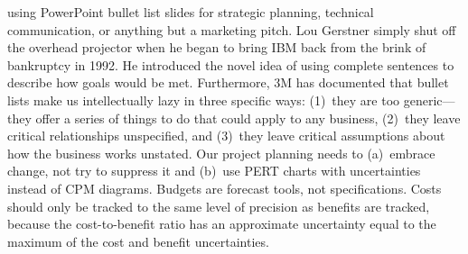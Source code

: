 \documentclass{tufte-handout}
\begin{document}
 using PowerPoint bullet list slides for strategic
planning, technical communication, or anything but a marketing pitch.
Lou Gerstner simply shut off the overhead projector when he
began to bring IBM back from the brink of bankruptcy in 1992.
He introduced the novel idea of using complete sentences to describe
how goals would be met.\cite{Gerstner2002}
Furthermore, 3M has documented\cite{Shaw1998}
that bullet lists make us intellectually
lazy in three specific ways: (1)~they are too generic---they offer a
series of things to do that could apply to any business, (2)~they leave
critical relationships unspecified, and (3)~they leave critical
assumptions about how the business works unstated.
Our project planning needs to (a)~embrace change, not try
to suppress it and (b)~use PERT charts with uncertainties
instead of CPM diagrams.\cite{Martin2003}
Budgets are forecast tools, not specifications.
Costs should only be tracked to the same level of precision as benefits
are tracked, because the cost-to-benefit ratio has an approximate
uncertainty equal to the maximum of the cost and benefit
uncertainties.\cite{DeMarco2003}
\end{document}
